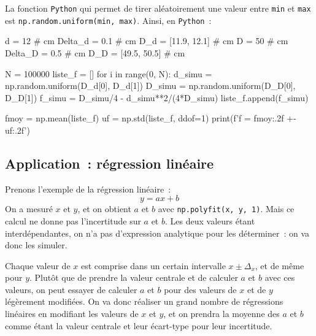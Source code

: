 \documentclass[a4paper, 12pt, garamond]{book}
\begin{document}
La fonction \texttt{Python} qui permet de tirer aléatoirement une valeur entre
\texttt{min} et \texttt{max} est \texttt{np.random.uniform(min, max)}. Ainsi, en
\texttt{Python}~:
\begin{python}
d = 12               # cm
Delta_d = 0.1        # cm
D_d = [11.9, 12.1]   # cm
D = 50               # cm
Delta_D = 0.5        # cm
D_D = [49.5, 50.5]   # cm

N = 100000
liste_f = []
for i in range(0, N):
    d_simu = np.random.uniform(D_d[0], D_d[1])
    D_simu = np.random.uniform(D_D[0], D_D[1])
    f_simu = D_simu/4 - d_simu**2/(4*D_simu)
    liste_f.append(f_simu)

fmoy = np.mean(liste_f)
uf = np.std(liste_f, ddof=1)
print(f'f = {fmoy:.2f} +- {uf:.2f}')
\end{python}

\subsection{Application~: régression linéaire}
Prenons l'exemple de la régression linéaire~:
\[
  y = ax+b
\]
On a mesuré $x$ et $y$, et on obtient $a$ et $b$ avec \texttt{np.polyfit(x, y,
1)}. Mais ce calcul ne donne pas l'incertitude sur $a$ et $b$. Les deux valeurs
étant interdépendantes, on n'a pas d'expression analytique pour les
déterminer~: on va donc les simuler.

Chaque valeur de $x$ est comprise dans un certain intervalle $x \pm \Delta_x$,
et de même pour $y$. Plutôt que de prendre la valeur centrale et de calculer $a$
et $b$ avec ces valeurs, on peut essayer de calculer $a$ et $b$ pour des valeurs
de $x$ et de $y$ légèrement modifiées. On va donc réaliser un grand nombre de
régressions linéaires en modifiant les valeurs de $x$ et $y$, et on prendra la
moyenne des $a$ et $b$ comme étant la valeur centrale et leur écart-type pour
leur incertitude.
\end{document}
